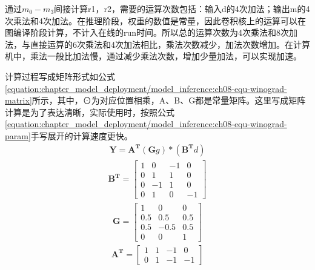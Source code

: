 \documentclass[letterpaper,10pt,english]{sphinxmanual}
\begin{document}
\sphinxAtStartPar
通过\(m_0-m_3\)间接计算r1，r2，需要的运算次数包括：输入d的4次加法；输出m的4次乘法和4次加法。在推理阶段，权重的数值是常量，因此卷积核上的运算可以在图编译阶段计算，不计入在线的run时间。所以总的运算次数为4次乘法和8次加法，与直接运算的6次乘法和4次加法相比，乘法次数减少，加法次数增加。在计算机中，乘法一般比加法慢，通过减少乘法次数，增加少量加法，可以实现加速。

\sphinxAtStartPar
计算过程写成矩阵形式如公式
\eqref{equation:chapter_model_deployment/model_inference:ch08-equ-winograd-matrix}所示，其中，⊙为对应位置相乘，A、B、G都是常量矩阵。这里写成矩阵计算是为了表达清晰，实际使用时，按照公式
\eqref{equation:chapter_model_deployment/model_inference:ch08-equ-winograd-param}手写展开的计算速度更快。
\begin{equation}\label{equation:chapter_model_deployment/model_inference:ch08-equ-winograd-matrix}
\begin{split}\mathbf{Y}=\mathbf{A^T}(\mathbf{G}g)*(\mathbf{B^T}d)\end{split}
\end{equation}\begin{equation}\label{equation:chapter_model_deployment/model_inference:ch08-equ-winograd-matrix-bt}
\begin{split}\mathbf{B^T}=\left[ \begin{matrix} 1 & 0 & -1 & 0 \\ 0 & 1 & 1 & 0 \\ 0 & -1 & 1 & 0 \\ 0 & 1 & 0 & -1 \end{matrix} \right]\end{split}
\end{equation}\begin{equation}\label{equation:chapter_model_deployment/model_inference:ch08-equ-winograd-matrix-g}
\begin{split}\mathbf{G}=\left[ \begin{matrix} 1 & 0 & 0 \\ 0.5 & 0.5 & 0.5 \\ 0.5 & -0.5 & 0.5 \\ 0 & 0 & 1 \end{matrix} \right]\end{split}
\end{equation}\begin{equation}\label{equation:chapter_model_deployment/model_inference:ch08-equ-winograd-matrix-at}
\begin{split}\mathbf{A^T}=\left[ \begin{matrix} 1 & 1 & -1 & 0 \\ 0 & 1 & -1 & -1  \end{matrix} \right] \\\end{split}
\end{equation}
\end{document}

